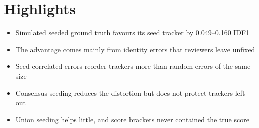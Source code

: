 \documentclass[11pt]{article}
\begin{document}
\section*{Highlights}
\begin{itemize}
\item Simulated seeded ground truth favours its seed tracker by 0.049--0.160 IDF1
\item The advantage comes mainly from identity errors that reviewers leave unfixed
\item Seed-correlated errors reorder trackers more than random errors of the same size
\item Consensus seeding reduces the distortion but does not protect trackers left out
\item Union seeding helps little, and score brackets never contained the true score
\end{itemize}
\end{document}

